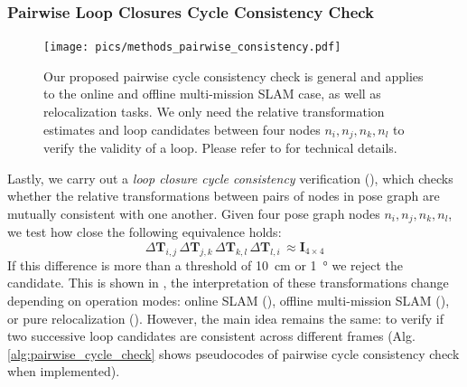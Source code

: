 \subsubsection*{\textbf{Pairwise Loop Closures Cycle Consistency Check}}
\begin{figure}[htbp]
  \centering
  \texttt{[image: pics/methods\_pairwise\_consistency.pdf]}
  \caption{Our proposed pairwise cycle consistency check is general and applies to the online and offline multi-mission SLAM case, as well as relocalization tasks. We only need the relative transformation estimates and loop candidates between four nodes $n_i, n_j, n_k, n_l$ to verify the validity of a loop. Please refer to  for technical details.}
  \label{fig:cycle-consistency}
\end{figure}
Lastly, we carry out a \emph{loop closure cycle consistency} verification (), which checks whether the relative transformations between pairs of nodes in pose graph are mutually consistent with one another. Given four pose graph nodes $n_i, n_j, n_k, n_l$, we test how close the following equivalence holds:
\begin{equation}
\Delta\mathbf{T}_{i,j}\, \Delta\mathbf{T}_{j,k}\, \Delta\mathbf{T}_{k,l}\, \Delta\mathbf{T}_{l,i}\, \approx \mathbf{I}_{4\times4} 
\end{equation}
If this difference is more than a threshold of \SI{10}{\centi\meter} or \SI{1}{\degree} we reject the candidate. This is shown in , the interpretation of these transformations change depending on operation modes: online SLAM (), offline multi-mission SLAM (), or pure relocalization (). However, the main idea remains the same: to verify if two successive loop candidates are consistent across different frames (Alg.\ref{alg:pairwise_cycle_check} shows pseudocodes of pairwise cycle consistency check when implemented).


